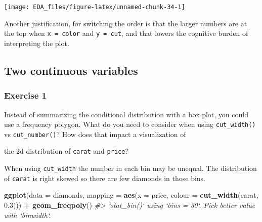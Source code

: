 \documentclass[]{book}
\newenvironment{Shaded}{\begin{snugshade}}{\end{snugshade}}
\newcommand{\CommentTok}[1]{\textcolor[rgb]{0.56,0.35,0.01}{\textit{#1}}}
\newcommand{\DataTypeTok}[1]{\textcolor[rgb]{0.13,0.29,0.53}{#1}}
\newcommand{\FloatTok}[1]{\textcolor[rgb]{0.00,0.00,0.81}{#1}}
\newcommand{\KeywordTok}[1]{\textcolor[rgb]{0.13,0.29,0.53}{\textbf{#1}}}
\newcommand{\NormalTok}[1]{#1}
\newcommand{\OperatorTok}[1]{\textcolor[rgb]{0.81,0.36,0.00}{\textbf{#1}}}
\newcommand{\StringTok}[1]{\textcolor[rgb]{0.31,0.60,0.02}{#1}}
\theoremstyle{definition}
\theoremstyle{definition}
\theoremstyle{definition}
\theoremstyle{remark}
\begin{document}
\begin{Shaded}
\end{Shaded}

\begin{center}\texttt{[image: EDA\_files/figure-latex/unnamed-chunk-34-1]} \end{center}

Another justification, for switching the order is that the larger
numbers are at the top when \texttt{x\ =\ color} and \texttt{y\ =\ cut},
and that lowers the cognitive burden of interpreting the plot.

\hypertarget{two-continuous-variables}{%
\subsection{Two continuous variables}\label{two-continuous-variables}}

\hypertarget{exercise-1-12}{%
\subsubsection{Exercise 1}\label{exercise-1-12}}

Instead of summarizing the conditional distribution with a box plot, you
could use a frequency polygon. What do you need to consider when using
\texttt{cut\_width()} vs \texttt{cut\_number()}? How does that impact a
visualization of

the 2d distribution of \texttt{carat} and \texttt{price}?

When using \texttt{cut\_width} the number in each bin may be unequal.
The distribution of \texttt{carat} is right skewed so there are few
diamonds in those bins.

\begin{Shaded}
\begin{Highlighting}[]
\KeywordTok{ggplot}\NormalTok{(}\DataTypeTok{data =}\NormalTok{ diamonds,}
       \DataTypeTok{mapping =} \KeywordTok{aes}\NormalTok{(}\DataTypeTok{x =}\NormalTok{ price,}
                     \DataTypeTok{colour =} \KeywordTok{cut_width}\NormalTok{(carat, }\FloatTok{0.3}\NormalTok{))) }\OperatorTok{+}
\StringTok{  }\KeywordTok{geom_freqpoly}\NormalTok{()}
\CommentTok{#> `stat_bin()` using `bins = 30`. Pick better value with `binwidth`.}
\end{Highlighting}
\end{Shaded}
\end{document}
